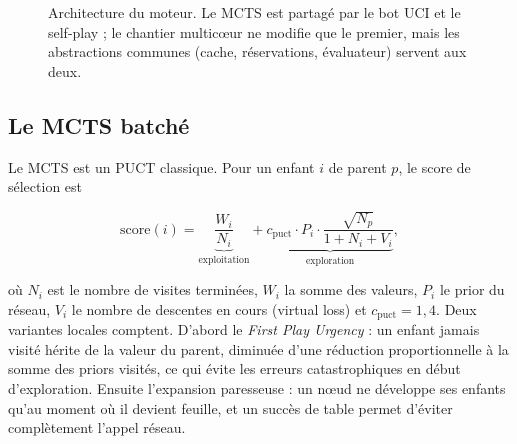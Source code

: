 \begin{figure}[t]
\centering
{}
\caption{Architecture du moteur. Le MCTS est partag\'e par le bot UCI et le
self-play ; le chantier multic\oe{}ur ne modifie que le premier, mais les
abstractions communes (cache, r\'eservations, \'evaluateur) servent aux deux.}
\label{fig:architecture}
\end{figure}

\subsection{Le MCTS batch\'e}

Le MCTS est un PUCT classique. Pour un enfant $i$ de parent $p$, le score de
s\'election est

\begin{equation}
\text{score}(i) = \underbrace{\frac{W_i}{N_i}}_{\text{exploitation}}
+ \underbrace{c_{\text{puct}} \cdot P_i \cdot
\frac{\sqrt{N_p}}{1 + N_i + V_i}}_{\text{exploration}},
\label{eq:puct}
\end{equation}

o\`u $N_i$ est le nombre de visites termin\'ees, $W_i$ la somme des valeurs,
$P_i$ le prior du r\'eseau, $V_i$ le nombre de descentes en cours (virtual
loss) et $c_{\text{puct}} = 1{,}4$. Deux variantes locales comptent. D'abord
le \emph{First Play Urgency} : un enfant jamais visit\'e h\'erite de la valeur
du parent, diminu\'ee d'une r\'eduction proportionnelle \`a la somme des
priors visit\'es, ce qui \'evite les erreurs catastrophiques en d\'ebut
d'exploration. Ensuite l'expansion paresseuse : un n\oe{}ud ne d\'eveloppe ses
enfants qu'au moment o\`u il devient feuille, et un succ\`es de table permet
d'\'eviter compl\`etement l'appel r\'eseau.

